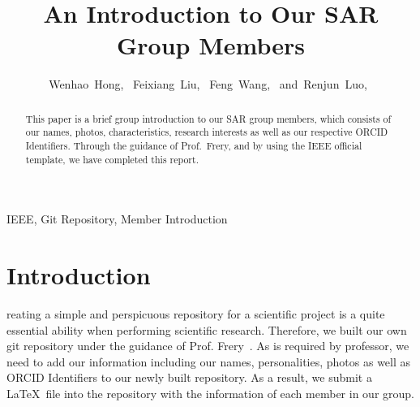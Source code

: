\documentclass[journal]{IEEEtran}
\begin{document}
\title{An Introduction to Our SAR Group Members}

\author{Wenhao~Hong,~
        Feixiang~Liu,~
        Feng~Wang,~
        and~Renjun~Luo,~%
}






\maketitle

\begin{abstract}
	This paper is a brief group introduction to our SAR group members, which consists of our names, photos, characteristics, research interests as well as our respective ORCID Identifiers. Through the guidance of Prof.\ Frery, and by using the IEEE official template, we have completed this report.
\end{abstract}

\begin{IEEEkeywords}
IEEE, Git Repository, Member Introduction
\end{IEEEkeywords}




\IEEEpeerreviewmaketitle



\section{Introduction}


reating a simple and perspicuous repository for a scientific project is a quite essential ability when performing scientific research. Therefore, we built our own git repository under the guidance of Prof. Frery~\citet{2020A}.
As is required by professor, we need to add our information including our names, personalities, photos as well as ORCID Identifiers to our newly built repository.
As a result, we submit a \LaTeX\ file into the repository with the information of each member in our group.
\end{document}
